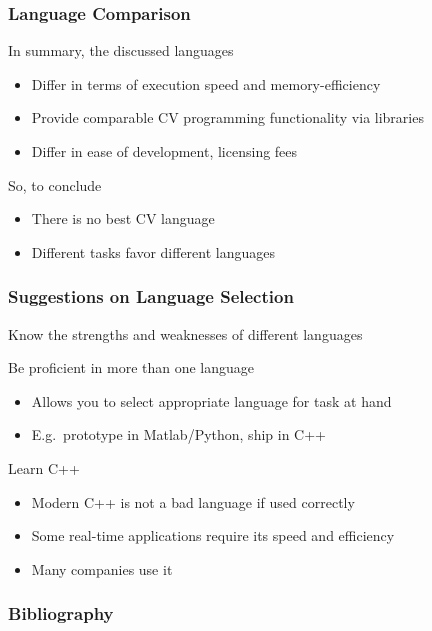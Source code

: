\documentclass[xetex,professionalfont]{beamer}
\let\oldemph\emph
\renewcommand\emph[1]{\textcolor{tuwcvl_inf_red}{#1}}
\begin{document}

\begin{frame}
\frametitle{Language Comparison}

In summary, the discussed languages
\begin{itemize}
	\item Differ in terms of execution speed and memory-efficiency
	\item Provide comparable CV programming functionality via libraries
	\item Differ in ease of development, licensing fees
\end{itemize}

\medskip
So, to conclude
\begin{itemize}
	\item There is no best CV language
	\item Different tasks favor different languages
\end{itemize}

\end{frame}


\begin{frame}
\frametitle{Suggestions on Language Selection}

Know the strengths and weaknesses of different languages

\medskip
Be proficient in more than one language
\begin{itemize}
	\item Allows you to select appropriate language for task at hand
	\item E.g.\ prototype in Matlab/Python, ship in C++
\end{itemize}

\medskip
Learn C++
\begin{itemize}
	\item Modern C++ is not a bad language if used correctly
	\item Some real-time applications require its speed and efficiency
	\item Many companies use it
\end{itemize}

\end{frame}


\renewcommand\emph[1]{\oldemph{#1}}

\begin{frame}
\frametitle{Bibliography}

\printbibliography

\end{frame}
\end{document}
